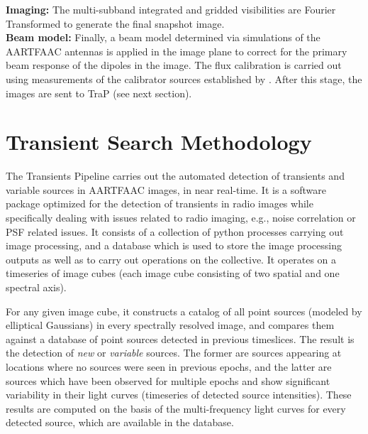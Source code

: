 \documentclass{ws-jai}
\begin{document}
\noindent   \textbf  {Imaging:}   The  multi-subband   integrated  and   gridded
visibilities are Fourier Transformed to generate the final snapshot image. \\

\noindent \textbf {Beam model:} Finally, a beam model determined via simulations
of  the AARTFAAC  antennas is  applied in  the image  plane to  correct for  the
primary beam  response of  the dipoles  in the image.   The flux  calibration is
carried out using  measurements of the calibrator sources  established by \citet
{scaife2012broad}.  After  this stage,  the images  are sent  to TraP  (see next
section).

\section {\label{sec:afaac_trap} Transient Search Methodology}
The  Transients  Pipeline  \citep[TraP;][]{swinbank2015lofar}  carries  out  the
automated detection  of transients and  variable sources in AARTFAAC  images, in
near  real-time.  It  is  a  software package  optimized  for  the detection  of
transients in  radio images  while specifically dealing  with issues  related to
radio imaging, e.g., noise correlation or  PSF related issues.  It consists of a
collection of  python processes  carrying out image  processing, and  a database
which is  used to store  the image  processing outputs as  well as to  carry out
operations on the collective.  It operates  on a timeseries of image cubes (each
image cube consisting of two spatial and one spectral axis).

For any given image cube, it constructs  a catalog of all point sources (modeled
by elliptical Gaussians)  in every spectrally resolved image,  and compares them
against a database of point sources detected in previous timeslices.  The result
is the detection  of \textit{new} or \textit{variable} sources.   The former are
sources appearing  at locations where no  sources were seen in  previous epochs,
and the latter are sources which have been observed for multiple epochs and show
significant variability  in their  light curves  (timeseries of  detected source
intensities). These  results are  computed on the  basis of  the multi-frequency
light curves for every detected source, which are available in the database.
\end{document}

